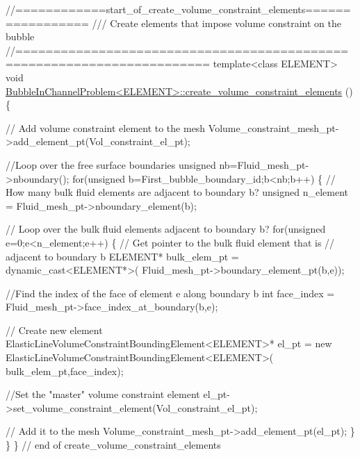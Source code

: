 \begin{DoxyCodeInclude}
\textcolor{comment}{//============start\_of\_create\_volume\_constraint\_elements=================}
\textcolor{comment}{/// Create elements that impose volume constraint on the bubble}
\textcolor{comment}{}\textcolor{comment}{//=======================================================================}
\textcolor{keyword}{template}<\textcolor{keyword}{class} ELEMENT>
\textcolor{keywordtype}{void} \hyperlink{classBubbleInChannelProblem_ae1ab79ef810211e337127878876c0fa6}{BubbleInChannelProblem<ELEMENT>::create\_volume\_constraint\_elements}
      ()
\{ 

 \textcolor{comment}{// Add volume constraint element to the mesh}
 Volume\_constraint\_mesh\_pt->add\_element\_pt(Vol\_constraint\_el\_pt);
 
 \textcolor{comment}{//Loop over the free surface boundaries}
 \textcolor{keywordtype}{unsigned} nb=Fluid\_mesh\_pt->nboundary();
 \textcolor{keywordflow}{for}(\textcolor{keywordtype}{unsigned} b=First\_bubble\_boundary\_id;b<nb;b++)
  \{
   \textcolor{comment}{// How many bulk fluid elements are adjacent to boundary b?}
   \textcolor{keywordtype}{unsigned} n\_element = Fluid\_mesh\_pt->nboundary\_element(b);
   
   \textcolor{comment}{// Loop over the bulk fluid elements adjacent to boundary b?}
   \textcolor{keywordflow}{for}(\textcolor{keywordtype}{unsigned} e=0;e<n\_element;e++)
    \{
     \textcolor{comment}{// Get pointer to the bulk fluid element that is }
     \textcolor{comment}{// adjacent to boundary b}
     ELEMENT* bulk\_elem\_pt = \textcolor{keyword}{dynamic\_cast<}ELEMENT*\textcolor{keyword}{>}(
      Fluid\_mesh\_pt->boundary\_element\_pt(b,e));
     
     \textcolor{comment}{//Find the index of the face of element e along boundary b}
     \textcolor{keywordtype}{int} face\_index = Fluid\_mesh\_pt->face\_index\_at\_boundary(b,e);
     
     \textcolor{comment}{// Create new element}
     ElasticLineVolumeConstraintBoundingElement<ELEMENT>* el\_pt =
      \textcolor{keyword}{new} ElasticLineVolumeConstraintBoundingElement<ELEMENT>(
       bulk\_elem\_pt,face\_index);   
     
     \textcolor{comment}{//Set the "master" volume constraint element}
     el\_pt->set\_volume\_constraint\_element(Vol\_constraint\_el\_pt);

     \textcolor{comment}{// Add it to the mesh}
     Volume\_constraint\_mesh\_pt->add\_element\_pt(el\_pt);     
    \} 
  \}
\}
\textcolor{comment}{// end of create\_volume\_constraint\_elements}

\end{DoxyCodeInclude}




